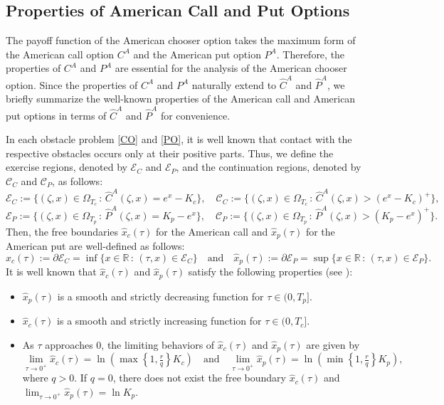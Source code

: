 \documentclass[11pt, a4paper, leqno]{amsart}
\numberwithin{equation}{section}
\theoremstyle{plain}
\theoremstyle{definition}
\theoremstyle{remark}
\begin{document}
\subsection{Properties of American Call and Put Options}
\label{Prop: C,P}
The payoff function of the American chooser option takes the maximum form of the American call option $C^A$ and the American put option $P^A$. Therefore, the properties of $C^A$ and $P^A$ are essential for the analysis of the American chooser option. Since the properties of $C^A$ and $P^A$ naturally extend to $\widehat{C}^A$ and $\widehat{P}^A$, we briefly summarize the well-known properties of the American call and American put options in terms of $\widehat{C}^A$ and $\widehat{P}^A$ for convenience.

In each obstacle problem \eqref{CO} and \eqref{PO}, 
it is well known that contact with the respective obstacles occurs only at their positive parts.
Thus, we define the exercise regions, denoted by $\mathcal{E}_C$ and $\mathcal{E}_P$, and the continuation regions, denoted by $\mathcal{C}_C$ and $\mathcal{C}_P$, as follows:
\[
\mathcal{E}_C:=\{(\zeta,x)\in \Omega_{T_c} \, : \, \widehat{C}^A(\zeta,x)=e^x-K_c\},\quad 
\mathcal{C}_C:=\{(\zeta,x)\in \Omega_{T_c} \, :\, \widehat{C}^A(\zeta,x)>(e^x-K_c)^+\},
 \]
\[        
\mathcal{E}_P:=\{(\zeta,x)\in \Omega_{T_p} \, :\, \widehat{P}^A(\zeta,x)=K_p-e^x\},\quad
\mathcal{C}_P:=\{(\zeta,x)\in \Omega_{T_p} \, :\, \widehat{P}^A(\zeta,x)>(K_p-e^x)^+\}.
\]
Then, the free boundaries $\hat{x}_c(\tau)$ for the American call and $\hat{x}_p(\tau)$ for the American put are well-defined as follows:
\begin{equation*}
    \hat{x}_c(\tau):=\partial\mathcal{E}_C=\inf\{x\in\mathbb{R}\, :\, (\tau,x)\in \mathcal{E}_C\}\quad \text{and}\quad \hat{x}_p(\tau):=\partial\mathcal{E}_P=\sup\{x\in\mathbb{R}\, :\, (\tau,x)\in \mathcal{E}_P\}.
\end{equation*}
It is well known that $\hat{x}_c(\tau)$ and $\hat{x}_p(\tau)$ satisfy the following properties (see \cite{Blanchet2006, Chen2012, Detemple2005, Peskir2005, ZF09, ZF09-1}):
\begin{itemize}
    \item $\hat{x}_p(\tau)$ is a smooth and strictly decreasing function for $\tau \in (0,T_p]$.
    \item $\hat{x}_c(\tau)$ is a smooth and strictly increasing function for $\tau \in (0,T_c]$.
    \item As $\tau$ approaches 0, the limiting behaviors of $\hat{x}_c(\tau)$ and $\hat{x}_p(\tau)$ are given by 
    \begin{equation*}
        \lim_{\tau \to 0^+} \hat{x}_c(\tau) = \ln{\left(\max\left\{1,\tfrac{r}{q}\right\}K_c\right)} 
        \quad \text{and} \quad
        \lim_{\tau \to 0^+} \hat{x}_p(\tau) = \ln{\left(\min\left\{1,\tfrac{r}{q}\right\}K_p\right)},
    \end{equation*}
    where $q>0$. If $q=0$, there does not exist the free boundary $\hat{x}_c(\tau)$ and  $ \lim_{\tau \to 0^+} \hat{x}_p(\tau) = \ln{K_p}$.
\end{itemize}
\end{document}
